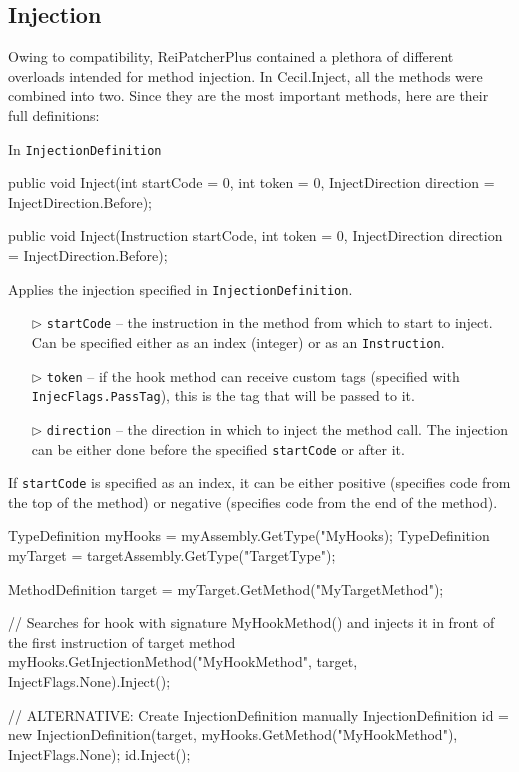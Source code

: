 \documentclass[a4paper,11pt]{article}
\newcommand{\CecilInject}{\textsc{C}{\scriptsize \sc ecil}.\textsc{I}{\scriptsize \sc nject}}
\begin{document}
\subsection{Injection}
Owing to compatibility, ReiPatcherPlus contained a plethora of different overloads intended for method injection. In \CecilInject{}, all the methods were combined into two.
Since they are the most important methods, here are their full definitions:
\begin{mdef}
In \texttt{InjectionDefinition}
\begin{cs}
public void Inject(int startCode = 0,
                   int token = 0, 
                   InjectDirection direction = InjectDirection.Before);
                   
public void Inject(Instruction startCode, 
                   int token = 0, 
                   InjectDirection direction = InjectDirection.Before);
\end{cs}

Applies the injection specified in \texttt{InjectionDefinition}.

\begin{itemize}
\item[$\triangleright$] \texttt{startCode} -- the instruction in the method from which to start to inject. Can be specified either as an index (integer) or as an \texttt{Instruction}.
\item[$\triangleright$] \texttt{token} -- if the hook method can receive custom tags (specified with \texttt{InjecFlags.PassTag}), this is the tag that will be passed to it.
\item[$\triangleright$] \texttt{direction} -- the direction in which to inject the method call. The injection can be either done before the specified \texttt{startCode} or after it.
\end{itemize}

\phantom{a}
If \texttt{startCode} is specified as an index, it can be either positive (specifies code from the top of the method) or negative (specifies code from the end of the method).

\begin{cs}
TypeDefinition myHooks = myAssembly.GetType("MyHooks);
TypeDefinition myTarget = targetAssembly.GetType("TargetType");

MethodDefinition target = myTarget.GetMethod("MyTargetMethod");

// Searches for hook with signature MyHookMethod() and injects it in front of the first instruction of target method
myHooks.GetInjectionMethod("MyHookMethod", 
                           target, 
                           InjectFlags.None).Inject();
                           
// ALTERNATIVE: Create InjectionDefinition manually
InjectionDefinition id = 
     new InjectionDefinition(target,
                             myHooks.GetMethod("MyHookMethod"),
                             InjectFlags.None);
id.Inject();                                     
\end{cs}
\end{mdef}
\end{document}
